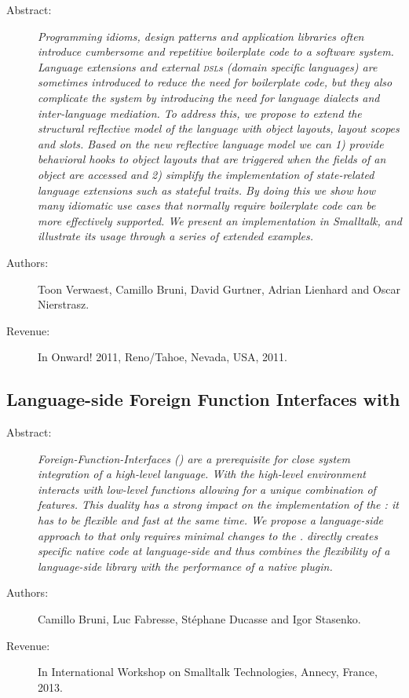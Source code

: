 \begin{description}
	\item[Abstract:] \emph{
Programming idioms, design patterns and application libraries often introduce cumbersome and repetitive boilerplate code to a software system.
Language extensions and external \textsc{dsl}s (domain specific languages) are sometimes introduced to reduce the need for boilerplate code, but they also complicate the system by introducing the need for language dialects and inter-language mediation.
To address this, we propose to extend the structural reflective model of the language with object layouts, layout scopes and slots.
Based on the new reflective language model we can 1) provide behavioral hooks to object layouts that are triggered when the fields of an object are accessed and 2) simplify the implementation of state-related language extensions such as stateful traits.
By doing this we show how many idiomatic use cases that normally require boilerplate code can be more effectively supported.
We present an implementation in Smalltalk, and illustrate its usage through a series of extended examples.}

	\item[Authors:] Toon Verwaest, Camillo Bruni, David Gurtner, Adrian Lienhard and Oscar Nierstrasz. 
	\item[Revenue:] In Onward! 2011, Reno/Tahoe, Nevada, USA, 2011.
\end{description}

\subsection{Language-side Foreign Function Interfaces with \NB}
\begin{description}
	\item[Abstract:] \emph{
		Foreign-Function-Interfaces (\FFIs) are a prerequisite for close system integration of a high-level language.
		With \FFIs the high-level environment interacts with low-level functions allowing for a unique combination of features.
		This duality has a strong impact on the implementation of the \FFI: it has to be flexible and fast at the same time.
		We propose \NB a language-side approach to \FFIs that only requires minimal changes to the \VM.
		\NB directly creates specific native code at language-side and thus combines the flexibility of a language-side library with the performance of a native plugin.}

	\item[Authors:] Camillo Bruni, Luc Fabresse, Stéphane Ducasse and Igor Stasenko. 
	\item[Revenue:] In International Workshop on Smalltalk Technologies, Annecy, France, 2013.
\end{description}



